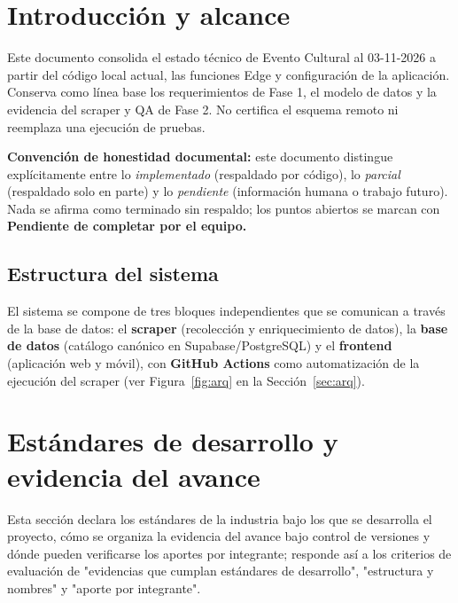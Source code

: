 \documentclass[11pt,a4paper]{article}
\newcommand{\pendiente}{\textcolor{rojo}{\textbf{Pendiente de completar por el equipo.}}}
\begin{document}
\tableofcontents
\newpage

\section{Introducción y alcance}
\label{sec:intro}

Este documento consolida el estado técnico de Evento Cultural al 03-11-2026 a partir
del código local actual, las funciones Edge y configuración de la aplicación. Conserva
como línea base los requerimientos de Fase 1, el modelo de datos y la evidencia del
scraper y QA de Fase 2. No certifica el esquema remoto ni reemplaza una ejecución de pruebas.

\textbf{Convención de honestidad documental:} este documento distingue explícitamente entre
lo \emph{implementado} (respaldado por código), lo \emph{parcial} (respaldado solo en parte)
y lo \emph{pendiente} (información humana o trabajo futuro). Nada se afirma como terminado
sin respaldo; los puntos abiertos se marcan con \pendiente

\subsection{Estructura del sistema}

El sistema se compone de tres bloques independientes que se comunican a través de la base
de datos: el \textbf{scraper} (recolección y enriquecimiento de datos), la \textbf{base de
datos} (catálogo canónico en Supabase/PostgreSQL) y el \textbf{frontend} (aplicación web y
móvil), con \textbf{GitHub Actions} como automatización de la ejecución del scraper
(ver Figura~\ref{fig:arq} en la Sección~\ref{sec:arq}).





\section{Estándares de desarrollo y evidencia del avance}
\label{sec:estandares}

Esta sección declara los estándares de la industria bajo los que se desarrolla el
proyecto, cómo se organiza la evidencia del avance bajo control de versiones y
dónde pueden verificarse los aportes por integrante; responde así a los criterios
de evaluación de "evidencias que cumplan estándares de desarrollo",
"estructura y nombres" y "aporte por integrante".
\end{document}
